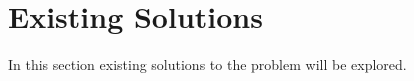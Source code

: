 \section{Existing Solutions}

In this section existing solutions to the problem will be explored.



